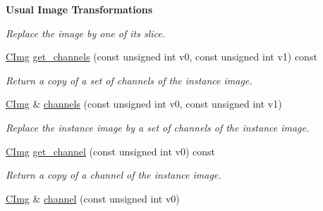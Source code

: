 \begin{Indent}{\bf Usual Image Transformations}
\begin{DoxyCompactItemize}
\begin{DoxyCompactList}\small\item\em Replace the image by one of its slice. \item\end{DoxyCompactList}\item 
\hypertarget{structcimg__library_1_1_c_img_a9a5652257b71feb82108388cee00813b}{
\hyperlink{structcimg__library_1_1_c_img}{CImg} \hyperlink{structcimg__library_1_1_c_img_a9a5652257b71feb82108388cee00813b}{get\_\-channels} (const unsigned int v0, const unsigned int v1) const }
\label{structcimg__library_1_1_c_img_a9a5652257b71feb82108388cee00813b}

\begin{DoxyCompactList}\small\item\em Return a copy of a set of channels of the instance image. \item\end{DoxyCompactList}\item 
\hypertarget{structcimg__library_1_1_c_img_a4697340cb41537695c29037889042413}{
\hyperlink{structcimg__library_1_1_c_img}{CImg} \& \hyperlink{structcimg__library_1_1_c_img_a4697340cb41537695c29037889042413}{channels} (const unsigned int v0, const unsigned int v1)}
\label{structcimg__library_1_1_c_img_a4697340cb41537695c29037889042413}

\begin{DoxyCompactList}\small\item\em Replace the instance image by a set of channels of the instance image. \item\end{DoxyCompactList}\item 
\hypertarget{structcimg__library_1_1_c_img_a9a96c001ff0f5ecd35ac1d1a3230c03b}{
\hyperlink{structcimg__library_1_1_c_img}{CImg} \hyperlink{structcimg__library_1_1_c_img_a9a96c001ff0f5ecd35ac1d1a3230c03b}{get\_\-channel} (const unsigned int v0) const }
\label{structcimg__library_1_1_c_img_a9a96c001ff0f5ecd35ac1d1a3230c03b}

\begin{DoxyCompactList}\small\item\em Return a copy of a channel of the instance image. \item\end{DoxyCompactList}\item 
\hypertarget{structcimg__library_1_1_c_img_a06ad2e9421683d330c2e94de93a27ea8}{
\hyperlink{structcimg__library_1_1_c_img}{CImg} \& \hyperlink{structcimg__library_1_1_c_img_a06ad2e9421683d330c2e94de93a27ea8}{channel} (const unsigned int v0)}
\label{structcimg__library_1_1_c_img_a06ad2e9421683d330c2e94de93a27ea8}


\end{DoxyCompactItemize}
\end{Indent}
